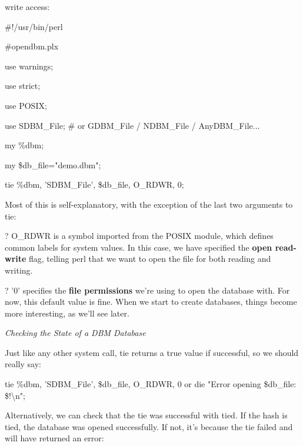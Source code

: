 \documentclass[a4paper,11pt]{book}
\begin{document}
\noindent write access:

\noindent 

\noindent \#!/usr/bin/perl

\noindent \#opendbm.plx

\noindent use warnings;

\noindent use strict;

\noindent use POSIX;

\noindent use SDBM\_File; \# or GDBM\_File / NDBM\_File / AnyDBM\_File...

\noindent 

\noindent 

\noindent my \%dbm;

\noindent my \$db\_file="demo.dbm";

\noindent 

\noindent tie \%dbm, 'SDBM\_File', \$db\_file, O\_RDWR, 0;

\noindent 

\noindent Most of this is self-explanatory, with the exception of the last two arguments to tie:

\noindent 

\noindent ? O\_RDWR is a symbol imported from the POSIX module, which defines common labels for system values. In this case, we have specified the \textbf{open read-write }flag, telling perl that we want to open the file for both reading and writing.

\noindent 

\noindent ? '0'  specifies the  \textbf{file permissions  }we're  using  to  open  the  database  with.  For now,  this  default value  is fine.  When we start  to  create  databases,  things  become  more  interesting,  as  we'll  see later.

\noindent 

\noindent \textit{Checking the State of a DBM Database}

\noindent Just like any other system call, tie returns a true value if successful, so we should really say:

\noindent 

\noindent tie \%dbm, 'SDBM\_File', \$db\_file, O\_RDWR, 0 or die "Error opening \$db\_file: \$!\textbackslash n";

\noindent 

\noindent Alternatively, we can check that the tie was successful with tied. If the hash is tied, the database was opened successfully. If not, it's because the tie failed and will have returned an error:
\end{document}

